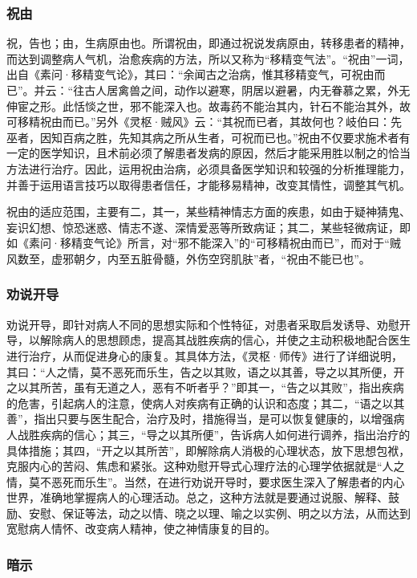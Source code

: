 \documentclass[12pt]{ctexbook}
\begin{document}
\subsubsection{祝由}%

祝，告也；由，生病原由也。所谓祝由，即通过祝说发病原由，转移患者的精神，而达到调整病人气机，治愈疾病的方法，所以又称为“移精变气法”。“祝由”一词，出自《素问·移精变气论》，其曰：“余闻古之治病，惟其移精变气，可祝由而已”。并云：“往古人居禽兽之间，动作以避寒，阴居以避暑，内无眷慕之累，外无伸宦之形。此恬惔之世，邪不能深入也。故毒药不能治其内，针石不能治其外，故可移精祝由而已。”另外《灵枢·贼风》云：“其祝而已者，其故何也？岐伯曰：先巫者，因知百病之胜，先知其病之所从生者，可祝而已也。”祝由不仅要求施术者有一定的医学知识，且术前必须了解患者发病的原因，然后才能采用胜以制之的恰当方法进行治疗。因此，运用祝由治病，必须具备医学知识和较强的分析推理能力，并善于运用语言技巧以取得患者信任，才能移易精神，改变其情性，调整其气机。

祝由的适应范围，主要有二，其一，某些精神情志方面的疾患，如由于疑神猜鬼、妄识幻想、惊恐迷惑、情志不遂、深情爱恶等所致病证；其二，某些轻微病证，即如《素问·移精变气论》所言，对“邪不能深入”的“可移精祝由而已”，而对于“贼风数至，虚邪朝夕，内至五脏骨髓，外伤空窍肌肤”者，“祝由不能已也”。

\subsubsection{劝说开导}%

劝说开导，即针对病人不同的思想实际和个性特征，对患者采取启发诱导、劝慰开导，以解除病人的思想顾虑，提高其战胜疾病的信心，并使之主动积极地配合医生进行治疗，从而促进身心的康复。其具体方法，《灵枢·师传》进行了详细说明，其曰：“人之情，莫不恶死而乐生，告之以其败，语之以其善，导之以其所便，开之以其所苦，虽有无道之人，恶有不听者乎？”即其一，“告之以其败”，指出疾病的危害，引起病人的注意，使病人对疾病有正确的认识和态度；其二，“语之以其善”，指出只要与医生配合，治疗及时，措施得当，是可以恢复健康的，以增强病人战胜疾病的信心；其三，“导之以其所便”，告诉病人如何进行调养，指出治疗的具体措施；其四，“开之以其所苦”，即解除病人消极的心理状态，放下思想包袱，克服内心的苦闷、焦虑和紧张。这种劝慰开导式心理疗法的心理学依据就是“人之情，莫不恶死而乐生”。当然，在进行劝说开导时，要求医生深入了解患者的内心世界，准确地掌握病人的心理活动。总之，这种方法就是要通过说服、解释、鼓励、安慰、保证等法，动之以情、晓之以理、喻之以实例、明之以方法，从而达到宽慰病人情怀、改变病人精神，使之神情康复的目的。

\subsubsection{暗示}%
\end{document}
